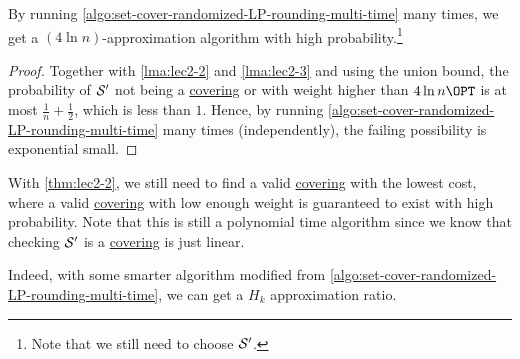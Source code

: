 \begin{theorem}\label{thm:lec2-2}
	By running \autoref{algo:set-cover-randomized-LP-rounding-multi-time} many times, we get a \((4\ln n)\)-approximation algorithm with high probability.\footnote{Note that we still need to choose \(\mathcal{\MakeUppercase{S}}^\prime \).}
\end{theorem}
\begin{proof}
	Together with \autoref{lma:lec2-2} and \autoref{lma:lec2-3} and using the union bound, the probability of \(\mathcal{\MakeUppercase{S}} ^\prime \) not being a \hyperref[def:covering]{covering} or with weight higher than \(4\ln n\OPT\) is at most \(\frac{1}{n} + \frac{1}{2}\), which is less than \(1\). Hence, by running \autoref{algo:set-cover-randomized-LP-rounding-multi-time} many times (independently), the failing possibility is exponential small.
\end{proof}

\begin{note}
	With \autoref{thm:lec2-2}, we still need to find a valid \hyperref[def:covering]{covering} with the lowest cost, where a valid \hyperref[def:covering]{covering} with low enough weight is guaranteed to exist with high probability. Note that this is still a polynomial time algorithm since we know that checking \(\mathcal{\MakeUppercase{S}} ^\prime \) is a \hyperref[def:covering]{covering} is just linear.
\end{note}

\begin{remark}
	Indeed, with some smarter algorithm modified from \autoref{algo:set-cover-randomized-LP-rounding-multi-time}, we can get a \(H_k\) approximation ratio.
\end{remark}